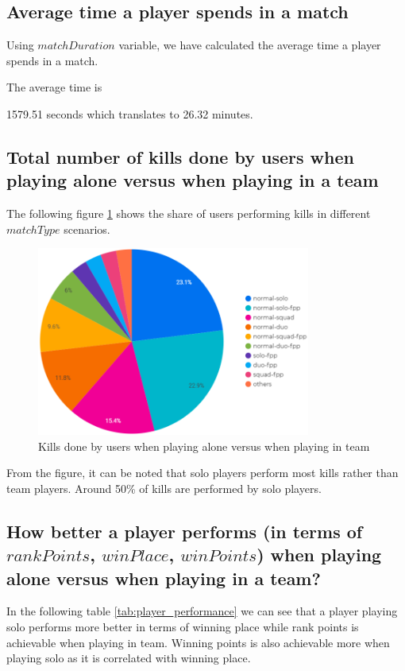 \documentclass[journal,twoside,web]{ieeecolor}
\begin{document}
\subsection{Average time a player spends in a match}
Using $matchDuration$ variable, we have calculated the average time a player spends in a match.

The average time is {1579.51 seconds which translates to 26.32 minutes. 

\subsection{Total number of kills done by users when playing alone versus when playing in a team}
The following figure \ref{fig:3} shows the share of users performing kills in different $matchType$ scenarios.

\begin{figure}[h]
    \includegraphics[width=9cm]{images/match_type_vs_kills.png}
    \caption{Kills done by users when playing alone versus when playing in team}
    \label{fig:3}
\end{figure}

From the figure, it can be noted that solo players perform most kills rather than team players. Around 50\% of kills are performed by solo players.

\subsection{How better a player performs (in terms of $rankPoints$, $winPlace$, $winPoints$) when playing alone versus when playing in a team?}
In the following table \ref{tab:player_performance} we can see that a player playing solo performs more better in terms of winning place while rank points is achievable when playing in team. Winning points is also achievable more when playing solo as it is correlated with winning place.

}
\end{document}
